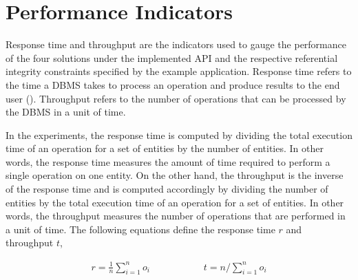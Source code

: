 \section{Performance Indicators} \label{sexp:PerformanceIndicators}

Response time and throughput are the indicators used to gauge the
performance of the four solutions under the implemented \ac{API} and the
respective referential integrity constraints specified by the example
application.  Response time refers to the time a \ac{DBMS}  takes to process an
operation and produce results to the end user ().  Throughput  refers to  the number of operations that can be
processed by the \ac{DBMS} in a unit of time. 

In the experiments,  the response time is computed by dividing the total
execution time of an operation for a set of entities by the number of entities.  In other
words,  the response time measures the amount of time required to perform a
single operation on one entity.  On the other hand,  the throughput is the
inverse of the response time and is computed accordingly by dividing the number of entities by
the total execution time of an operation for a set of entities.  In other words, 
the throughput measures the number of operations that are performed in a unit
of time.  The following equations define the response time $r$ and throughput
$t$,
 


\begin{equation*}
\begin{gathered}
\displaystyle r = \frac{1}{n}\sum_{i = 1}^{n}{o_i}
\end{gathered} \hspace{2cm}
\begin{gathered}
t = n / \sum_{i = 1}^{n}{o_i}  
\end{gathered}
\end{equation*}

% 	 

